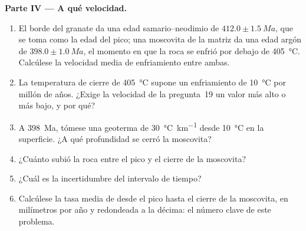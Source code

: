 \begin{problem}
\noindent\textbf{Parte IV --- A qué velocidad.}
\begin{enumerate}[resume]
\item El borde del granate da una edad samario--neodimio de $412.0 \pm \qty{1.5}{Ma}$, que se toma
como la edad del pico; una moscovita de la matriz da una edad argón de $398.0 \pm
\qty{1.0}{Ma}$, el momento en que la roca se enfrió por debajo de \qty{405}{\celsius}. Calcúlese
la velocidad media de enfriamiento entre ambas.
\item La temperatura de cierre de \qty{405}{\celsius} supone un enfriamiento de
\qty{10}{\celsius} por millón de años. ¿Exige la velocidad de la pregunta~19 un valor más alto o más
bajo, y por qué?
\item A \qty{398}{Ma}, tómese una geoterma de \qty{30}{\celsius\per\km} desde
\qty{10}{\celsius} en la superficie. ¿A qué profundidad se cerró la moscovita?
\item ¿Cuánto subió la roca entre el pico y el cierre de la moscovita?
\item ¿Cuál es la incertidumbre del intervalo de tiempo?
\item Calcúlese la tasa media de  desde el pico hasta el cierre de la moscovita, en
milímetros por año y redondeada a la décima: el número clave de este problema.
\end{enumerate}
\end{problem}
